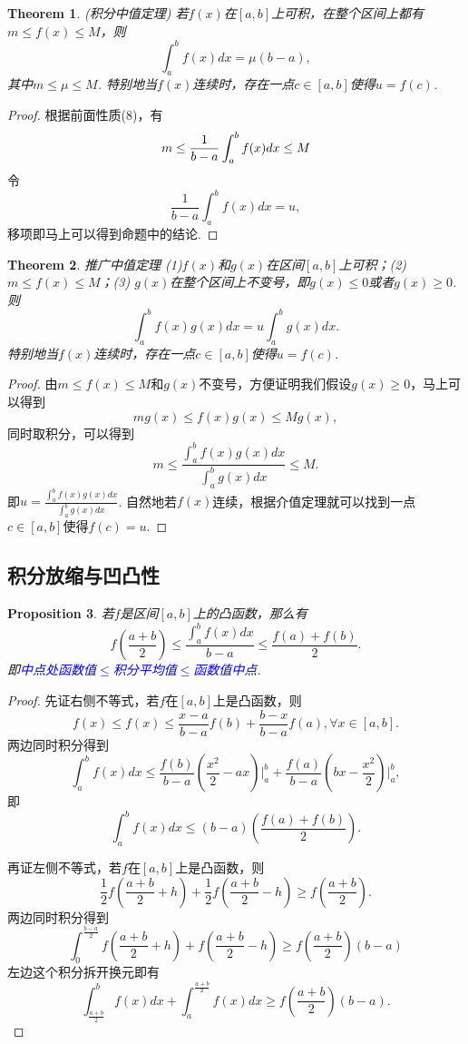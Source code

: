 \documentclass{article}
\newtheorem{theorem}{Theorem}[section]
\newtheorem{proposition}[theorem]{Proposition}
\newcommand{\bluet}[1]{\textcolor{blue}{#1}}
\begin{document}
\begin{theorem}
\rm {\color{red} (积分中值定理) } 若$f(x)$在$[a,b]$上可积，在整个区间上都有$m \leq f(x) \leq M$，则
$$
\int_a^b f(x)dx = \mu(b-a),
$$
其中$m\leq \mu \leq M$. 特别地当$f(x)$连续时，存在一点$c\in [a,b]$使得$u=f(c)$.  
\end{theorem}

\begin{proof}
根据前面性质(8)，有
$$
m \leq \frac{1}{b-a}\int_a^b f(x)dx \leq M \\
$$
令
$$
\frac{1}{b-a}\int_a^b f(x)dx = u,
$$
移项即马上可以得到命题中的结论.
\end{proof}

\begin{theorem}
\rm {\color{red} 推广中值定理} (1)$f(x)$和$g(x)$在区间$[a,b]$上可积；(2)$m\leq f(x) \leq M$；(3) $g(x)$在整个区间上不变号，即$g(x) \leq 0$或者$g(x) \geq 0$. 则
$$
\int_a^b f(x)g(x)dx = u\int_a^b g(x)dx.
$$
特别地当$f(x)$连续时，存在一点$c\in [a,b]$使得$u=f(c)$.  
\end{theorem}

\begin{proof}
由$m \leq f(x) \leq M$和$g(x)$不变号，方便证明我们假设$g(x) \geq 0$，马上可以得到
$$
mg(x) \leq f(x)g(x) \leq Mg(x),
$$
同时取积分，可以得到
$$
m \leq \frac{\int_a^b f(x)g(x)dx}{\int_a^b g(x)dx} \leq M.
$$
即$u = \frac{\int_a^b f(x)g(x)dx}{\int_a^b g(x)dx}$. 自然地若$f(x)$连续，根据介值定理就可以找到一点$c \in [a,b]$使得$f(c) = u$.
\end{proof}

\subsection{积分放缩与凹凸性}

\begin{proposition}
\rm 若$f$是区间$[a,b]$上的凸函数，那么有
$$
f\left(\frac{a+b}{2}\right) \leq \frac{\int_a^b f(x)dx}{b-a} \leq \frac{f(a)+f(b)}{2}.
$$
即\bluet{中点处函数值$\leq$积分平均值$\leq$函数值中点}.
\end{proposition}

\begin{proof}
\rm 先证右侧不等式，若$f$在$[a,b]$上是凸函数，则
$$
f(x) \leq f(x)\leq \frac {x-a}{b-a}f(b)+\frac {b-x}{b-a}f(a),\forall x\in [a,b].
$$
两边同时积分得到
$$
\int_a^b f(x)dx \leq \frac{f(b)}{b-a}(\frac {x^2}{2}-ax)\bigg|_a^b+\frac{f(a)}{b-a}(bx-\frac {x^2}{2})\bigg|_a^b,
$$
即
$$
\int_a^b f(x)dx \leq (b-a)\left(\frac{f(a)+f(b)}2\right).
$$

再证左侧不等式，若$f$在$[a,b]$上是凸函数，则
$$
\frac{1}{2}f\left(\frac{a+b}{2}+h\right) + \frac{1}{2}f\left(\frac{a+b}{2}-h\right) \geq f\left(\frac{a+b}{2}\right). 
$$
两边同时积分得到
$$
\int_{0}^{\frac{b-a}{2}} f\left(\frac{a+b}{2}+h\right) + f\left(\frac{a+b}{2}-h\right) \geq f\left(\frac{a+b}{2}\right)(b-a) 
$$
左边这个积分拆开换元即有
$$
\int_{\frac{a+b}{2}}^{b}f(x)dx + \int_{a}^{\frac{a+b}{2}}f(x)dx  \geq f\left(\frac{a+b}{2}\right)(b-a). 
$$
\end{proof}
\end{document}
